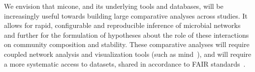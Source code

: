   We envision that \ac{micone}, and its underlying tools and databases, will be increasingly useful towards building large comparative analyses across studies.
  It allows for rapid, configurable and reproducible inference of microbial networks and further for the formulation of hypotheses about the role of these interactions on community composition and stability.
  These comparative analyses will require coupled network analysis and visualization tools (such as \ac{mind}~\cite{huResourceComparisonIntegration2022}), and will require a more systematic access to datasets, shared in accordance to FAIR standards~\cite{pachecoFAIRRepresentationsMicrobial2022}.
